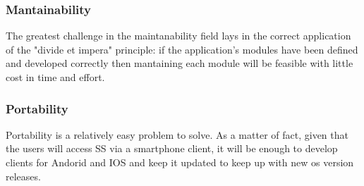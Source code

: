 	\subsubsection{Mantainability}
	The greatest challenge in the maintanability field lays in the correct application of the "divide et impera" principle: if the application's modules have been defined and developed correctly then mantaining each module will be feasible with little cost in time and effort.
	\subsubsection{Portability}
	Portability is a relatively easy problem to solve. As a matter of fact, given that the users will access SS via a smartphone client, it will be enough to develop clients for Andorid and IOS and keep it updated to keep up with new os version releases. 
